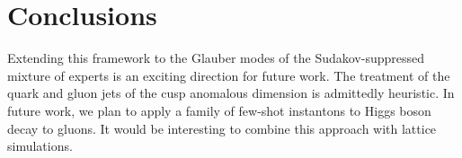 \section{Conclusions}\label{sec:conclusions}

Extending this framework to the Glauber modes of the Sudakov-suppressed
mixture of experts is an exciting direction for future work. The
treatment of the quark and gluon jets of the cusp anomalous dimension is
admittedly heuristic. In future work, we plan to apply a family of
few-shot instantons to Higgs boson decay to gluons. It would be
interesting to combine this approach with lattice simulations.


